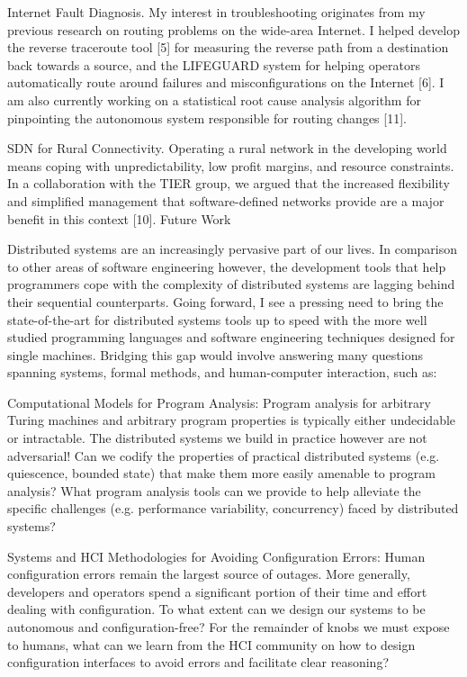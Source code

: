 Internet Fault Diagnosis. My interest in troubleshooting originates from my previous research on routing problems on the wide-area Internet. I helped develop the reverse traceroute tool [5] for measuring the reverse path from a destination back towards a source, and the LIFEGUARD system for helping operators automatically route around failures and misconfigurations on the Internet [6]. I am also currently working on a statistical root cause analysis algorithm for pinpointing the autonomous system responsible for routing changes [11].

SDN for Rural Connectivity. Operating a rural network in the developing world means coping with unpredictability, low profit margins, and resource constraints. In a collaboration with the TIER group, we argued that the increased flexibility and simplified management that software-defined networks provide are a major benefit in this context [10].
Future Work

Distributed systems are an increasingly pervasive part of our lives. In comparison to other areas of software engineering however, the development tools that help programmers cope with the complexity of distributed systems are lagging behind their sequential counterparts. Going forward, I see a pressing need to bring the state-of-the-art for distributed systems tools up to speed with the more well studied programming languages and software engineering techniques designed for single machines. Bridging this gap would involve answering many questions spanning systems, formal methods, and human-computer interaction, such as:

Computational Models for Program Analysis: Program analysis for arbitrary Turing machines and arbitrary program properties is typically either undecidable or intractable. The distributed systems we build in practice however are not adversarial! Can we codify the properties of practical distributed systems (e.g. quiescence, bounded state) that make them more easily amenable to program analysis? What program analysis tools can we provide to help alleviate the specific challenges (e.g. performance variability, concurrency) faced by distributed systems?

Systems and HCI Methodologies for Avoiding Configuration Errors: Human configuration errors remain the largest source of outages. More generally, developers and operators spend a significant portion of their time and effort dealing with configuration. To what extent can we design our systems to be autonomous and configuration-free? For the remainder of knobs we must expose to humans, what can we learn from the HCI community on how to design configuration interfaces to avoid errors and facilitate clear reasoning?

